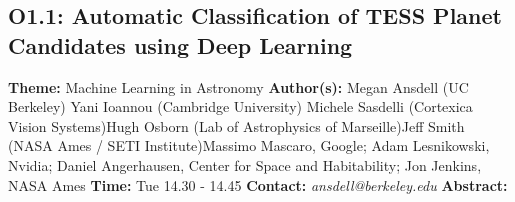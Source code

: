 \documentclass{report}
\begin{document}
{{{{{{{{\subsection*{O1.1: Automatic Classification of TESS Planet Candidates using Deep Learning}
{\bf Theme:}  Machine Learning in Astronomy\newline
{\bf Author(s):}\newline
Megan Ansdell (UC Berkeley) \newline Yani Ioannou (Cambridge University) \newline  Michele Sasdelli (Cortexica Vision Systems)\newline  Hugh Osborn (Lab of Astrophysics of Marseille)\newline Jeff Smith (NASA Ames / SETI Institute)\newline  Massimo Mascaro, Google; Adam Lesnikowski, Nvidia; Daniel Angerhausen, Center for Space and Habitability; Jon Jenkins, NASA Ames\newline\newline
{\bf Time:} Tue 14.30 - 14.45\newline
\newline
{\bf Contact:} {\it ansdell@berkeley.edu}\newline
\newline\newline
{\bf Abstract:}\newline
}}}}}}}}
\end{document}
